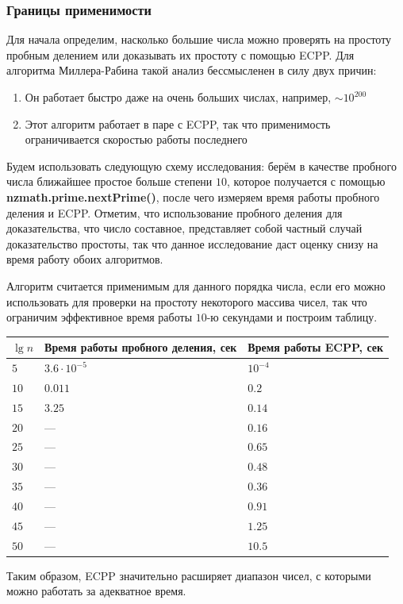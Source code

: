\documentclass[12pt]{article}
\theoremstyle{definition}
\numberwithin{Def}{section}
\numberwithin{Th}{section}
\numberwithin{St}{section}
\numberwithin{Cor}{section}
\begin{document}
\subsubsection{Границы применимости}

Для начала определим, насколько большие числа можно проверять на простоту
пробным делением или доказывать их простоту с помощью ECPP. Для алгоритма
Миллера-Рабина такой анализ бессмысленен в силу двух причин:
\begin{enumerate}
\item Он работает быстро даже на очень больших числах, например, $\sim 10^{200}$
\item Этот алгоритм работает в паре с ECPP, так что применимость ограничивается
скоростью работы последнего
\end{enumerate}

Будем использовать следующую схему исследования: берём в качестве пробного
числа ближайшее простое больше степени $10$, которое получается с помощью
\textbf{nzmath.prime.nextPrime()}, после чего измеряем время работы
пробного деления и ECPP. Отметим, что использование пробного деления
для доказательства, что число составное, представляет собой частный случай
доказательство простоты, так что данное исследование даст оценку снизу на время
работу обоих алгоритмов. 

Алгоритм считается применимым для данного порядка числа, если его можно 
использовать для проверки на простоту некоторого массива чисел, так что ограничим
эффективное время работы $10$-ю секундами и построим таблицу.

\begin{center}
\begin{tabular}{|l|l|l|}
\hline
$\lg n$ & Время работы пробного деления, сек & Время работы ECPP, сек \\ \hline
$5$ & $3.6\cdot 10^{-5}$ & $10^{-4}$\\ \hline
$10$ & $0.011$ & $0.2$\\ \hline
$15$ & $3.25$ & $0.14$\\ \hline
$20$ & — & $0.16$\\ \hline
$25$ & — & $0.65$\\ \hline
$30$ & — & $0.48$\\ \hline
$35$ & — & $0.36$\\ \hline
$40$ & — & $0.91$\\ \hline
$45$ & — & $1.25$\\ \hline
$50$ & — & $10.5$\\ \hline
\end{tabular}
\end{center}
Таким образом, ECPP значительно расширяет диапазон чисел, с которыми можно
работать за адекватное время.
\end{document}
